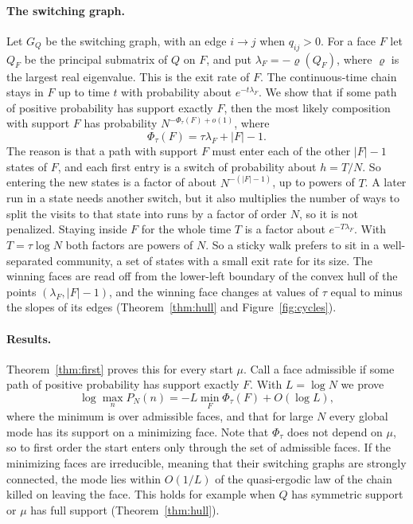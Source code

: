 \paragraph{The switching graph.}
Let $G_Q$ be the switching graph, with an edge $i\to j$ when $q_{ij}>0$.
For a face $F$ let $Q_F$ be the principal submatrix of $Q$ on $F$, and put
$\lambda_F=-\varrho(Q_F)$, where $\varrho$ is the largest real eigenvalue.
This is the exit rate of $F$. The continuous-time chain stays in $F$ up to
time $t$ with probability about $e^{-t\lambda_F}$. We show that if some
path of positive probability has support exactly $F$, then the most likely
composition with support $F$ has probability $N^{-\Phi_\tau(F)+o(1)}$, where
\[
 \Phi_\tau(F)=\tau\lambda_F+\lvert F\rvert-1 .
\]
The reason is that a path with support $F$ must enter each of the other
$\lvert F\rvert-1$ states of $F$, and each first entry is a switch of
probability about $h=T/N$. So entering the new states is a factor of about
$N^{-(\lvert F\rvert-1)}$, up to powers of $T$. A later run in a state needs
another switch,
but it also multiplies the number of ways to split the visits to that
state into runs by a factor of order $N$, so it is not penalized. Staying
inside $F$ for the whole time $T$ is a factor about $e^{-T\lambda_F}$. With
$T=\tau\log N$ both factors are powers of $N$. So a sticky walk prefers to
sit in a well-separated community, a set of states with a small exit rate
for its size. The winning faces are read off from the lower-left boundary
of the convex hull of the points $(\lambda_F,\lvert F\rvert-1)$, and the
winning face changes at
values of $\tau$ equal to minus the slopes of its edges
(Theorem~\ref{thm:hull} and Figure~\ref{fig:cycles}).

\paragraph{Results.}
Theorem~\ref{thm:first} proves this for every start $\mu$. Call a
face admissible if some path of positive probability has support exactly
$F$. With $L=\log N$ we prove
\[
 \log\max_nP_N(n)=-L\min_F\Phi_\tau(F)+O(\log L),
\]
where the minimum is over admissible faces, and that for large $N$ every
global mode has its support on a minimizing face. Note that $\Phi_\tau$
does not depend on $\mu$, so to first order the start enters only through
the set of admissible faces. If the minimizing faces are irreducible, meaning that
their switching graphs are strongly connected, the mode lies within
$O(1/L)$ of the quasi-ergodic law of the chain killed on leaving the face.
This holds for example when $Q$ has symmetric support or $\mu$ has full
support (Theorem~\ref{thm:hull}).

